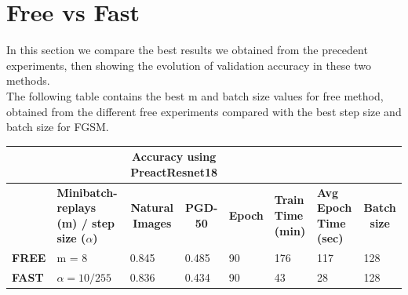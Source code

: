 \documentclass{article}
\begin{document}
\section{Free vs Fast}
In this section we compare the best results we obtained from the precedent experiments,
then showing the evolution of validation accuracy in these two methods. 
\\
The following table contains the best m and batch size values for free method, obtained from the different free experiments compared with the best step size and batch size for FGSM. 
\begin{table}[hbt!]
\begin{tabular}{|l|p{2.1cm}|c|l|l|l|l|l|}
\hline
              & \multicolumn{1}{l|}{}         & \multicolumn{2}{c|}{\textbf{Accuracy using PreactResnet18}}                         & \multicolumn{3}{l|}{\textbf{}}                                                                                                            & \textbf{}                                \\ \hline
 & \textbf{Minibatch-replays (m) / step size ($\alpha$)} & \textbf{Natural Images}                      & \multicolumn{1}{c|}{\textbf{PGD-50}} & \multicolumn{1}{c|}{\textbf{Epoch}} & \multicolumn{1}{p{1cm}|}{\textbf{Train Time (min)}} & \multicolumn{1}{p{1cm}|}{\textbf{Avg Epoch Time (sec)}} & \multicolumn{1}{c|}{\textbf{Batch size}} \\ \hline
\textbf{FREE} & m = 8 & \multicolumn{1}{l|}{0.845} & { 0.485}         & { 90}           & { 176}                     & { 117}                         & { 128}               \\ \hline
\textbf{FAST} & $\alpha = 10/255$       & \multicolumn{1}{l|}{0.836} & { 0.434}         & { 90}           & { 43}                     & { 28}                         & { 128}               \\ \hline
\end{tabular}
\end{table}
\end{document}
